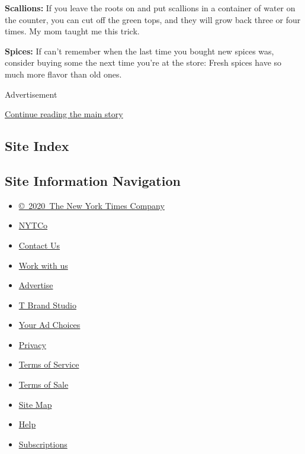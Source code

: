 \textbf{Scallions:} If you leave the roots on and put scallions in a
container of water on the counter, you can cut off the green tops, and
they will grow back three or four times. My mom taught me this trick.

\textbf{Spices:} If can't remember when the last time you bought new
spices was, consider buying some the next time you're at the store:
Fresh spices have so much more flavor than old ones.

Advertisement

\protect\hyperlink{after-bottom}{Continue reading the main story}

\hypertarget{site-index}{%
\subsection{Site Index}\label{site-index}}

\hypertarget{site-information-navigation}{%
\subsection{Site Information
Navigation}\label{site-information-navigation}}

\begin{itemize}
\tightlist
\item
  \href{https://help.nytimes3xbfgragh.onion/hc/en-us/articles/115014792127-Copyright-notice}{©~2020~The
  New York Times Company}
\end{itemize}

\begin{itemize}
\tightlist
\item
  \href{https://www.nytco.com/}{NYTCo}
\item
  \href{https://help.nytimes3xbfgragh.onion/hc/en-us/articles/115015385887-Contact-Us}{Contact
  Us}
\item
  \href{https://www.nytco.com/careers/}{Work with us}
\item
  \href{https://nytmediakit.com/}{Advertise}
\item
  \href{http://www.tbrandstudio.com/}{T Brand Studio}
\item
  \href{https://www.nytimes3xbfgragh.onion/privacy/cookie-policy\#how-do-i-manage-trackers}{Your
  Ad Choices}
\item
  \href{https://www.nytimes3xbfgragh.onion/privacy}{Privacy}
\item
  \href{https://help.nytimes3xbfgragh.onion/hc/en-us/articles/115014893428-Terms-of-service}{Terms
  of Service}
\item
  \href{https://help.nytimes3xbfgragh.onion/hc/en-us/articles/115014893968-Terms-of-sale}{Terms
  of Sale}
\item
  \href{https://spiderbites.nytimes3xbfgragh.onion}{Site Map}
\item
  \href{https://help.nytimes3xbfgragh.onion/hc/en-us}{Help}
\item
  \href{https://www.nytimes3xbfgragh.onion/subscription?campaignId=37WXW}{Subscriptions}
\end{itemize}
